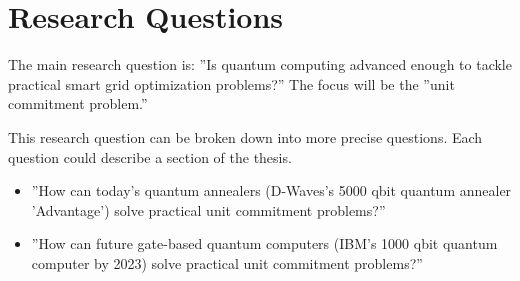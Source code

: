 \section{Research Questions}

The main research question is:
''Is quantum computing advanced enough to tackle practical
smart grid optimization problems?''
The focus will be the ''unit commitment problem.''

This research question can be broken down into more precise questions.
Each question could describe a section of the thesis.
\begin{itemize}
  \item ''How can today's quantum annealers (D-Waves's 5000 qbit quantum annealer 'Advantage') solve practical unit commitment problems?''
  \item ''How can future gate-based quantum computers (IBM's 1000 qbit quantum computer by 2023) solve practical unit commitment problems?''
\end{itemize}